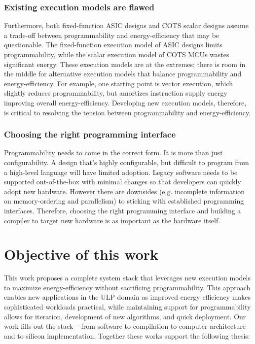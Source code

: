 \subsubsection{Existing execution models are flawed}
Furthermore, both fixed-function ASIC designs and COTS scalar designs assume a trade-off between programmability and energy-efficiency that may be questionable.
% 
The fixed-function execution model of ASIC designs limits programmability, while the scalar execution model of COTS MCUs wastes significant energy.
% 
These execution models are at the extremes; there is room in the middle for alternative execution models that balance programmability and energy-efficiency.
% 
For example, one starting point is vector execution, which slightly reduces programmability, but amortizes instruction supply energy improving overall energy-efficiency.
% 
Developing new execution models, therefore, is critical to resolving the tension between programmability and energy-efficiency.

\subsubsection{Choosing the right programming interface}
Programmability needs to come in the correct form.
% 
It is more than just configurability.
% 
A design that's highly configurable, but difficult to program from a high-level language will have limited adoption.
% 
Legacy software needs to be supported out-of-the-box with minimal changes so that developers can quickly adopt new hardware.
% 
However there are downsides (e.g. incomplete information on memory-ordering and parallelism) to sticking with established programming interfaces.
% 
Therefore, choosing the right programming interface and building a compiler to target new hardware is as important as the hardware itself.


\figOverview

\section{Objective of this work}

This work proposes a complete system stack that leverages new execution models to maximize energy-efficiency without sacrificing programmability.
% 
This approach enables new applications in the ULP domain as improved energy efficiency makes sophisticated workloads practical, while maintaining support for programmability allows for iteration, development of new algorithms, and quick deployment. 
% 
Our work fills out the stack -- from software to compilation to computer architecture and to silicon implementation.
% 
Together these works support the following thesis:

